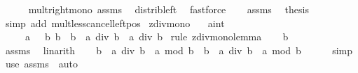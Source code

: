 \begin{isabellebody}
\ \ \ \ \isamarkupfalse%
\ mult{\isacharunderscore}{\kern0pt}right{\isacharunderscore}{\kern0pt}mono\ assms\ \isamarkupfalse%
\ distrib{\isacharunderscore}{\kern0pt}left\ \isamarkupfalse%
\ fastforce\isanewline
\ \ \isamarkupfalse%
\ assms\ \isamarkupfalse%
\ {\isacharquery}{\kern0pt}thesis\isanewline
\ \ \ \ \isamarkupfalse%
\ {\isacharparenleft}{\kern0pt}simp\ add{\isacharcolon}{\kern0pt}\ mult{\isacharunderscore}{\kern0pt}less{\isacharunderscore}{\kern0pt}cancel{\isacharunderscore}{\kern0pt}left{\isacharunderscore}{\kern0pt}pos{\isacharparenright}{\kern0pt}\isanewline
{}\isamarkupfalse%
%
\endisatagproof
{\isafoldproof}%
%
\isadelimproof
\isanewline
%
\endisadelimproof
\isanewline
{}\isamarkupfalse%
\ zdiv{\isacharunderscore}{\kern0pt}mono{}{\isacharcolon}{\kern0pt}\isanewline
\ \ \ a{\isacharcolon}{\kern0pt}{\isacharcolon}{\kern0pt}int\isanewline
\ \ \ {\isachardoublequoteopen}{}\ {\isasymle}\ a{\isachardoublequoteclose}\ {\isachardoublequoteopen}{}\ {\isacharless}{\kern0pt}\ b{\isacharprime}{\kern0pt}{\isachardoublequoteclose}\ {\isachardoublequoteopen}b{\isacharprime}{\kern0pt}\ {\isasymle}\ b{\isachardoublequoteclose}\ \ {\isachardoublequoteopen}a\ div\ b\ {\isasymle}\ a\ div\ b{\isacharprime}{\kern0pt}{\isachardoublequoteclose}\isanewline
%
\isadelimproof
%
\endisadelimproof
%
\isatagproof
{}\isamarkupfalse%
\ {\isacharparenleft}{\kern0pt}rule\ zdiv{\isacharunderscore}{\kern0pt}mono{}{\isacharunderscore}{\kern0pt}lemma{\isacharparenright}{\kern0pt}\isanewline
\ \ \isamarkupfalse%
\ {\isachardoublequoteopen}b\ {\isasymnoteq}\ {}{\isachardoublequoteclose}\isanewline
\ \ \ \ \isamarkupfalse%
\ assms\ \isamarkupfalse%
\ linarith\isanewline
\ \ \isamarkupfalse%
\ {\isachardoublequoteopen}b\ {\isacharasterisk}{\kern0pt}\ {\isacharparenleft}{\kern0pt}a\ div\ b{\isacharparenright}{\kern0pt}\ {\isacharplus}{\kern0pt}\ a\ mod\ b\ {\isacharequal}{\kern0pt}\ b{\isacharprime}{\kern0pt}\ {\isacharasterisk}{\kern0pt}\ {\isacharparenleft}{\kern0pt}a\ div\ b{\isacharprime}{\kern0pt}{\isacharparenright}{\kern0pt}\ {\isacharplus}{\kern0pt}\ a\ mod\ b{\isacharprime}{\kern0pt}{\isachardoublequoteclose}\isanewline
\ \ \ \ \isamarkupfalse%
\ simp\isanewline
{}\isamarkupfalse%
\ {\isacharparenleft}{\kern0pt}use\ assms\ \ auto{\isacharparenright}{\kern0pt}%

\end{isabellebody}
